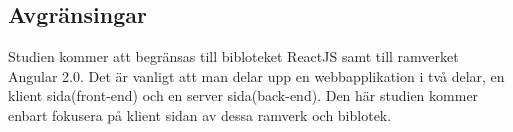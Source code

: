 \subsection{Avgränsingar}
\label{subsec:delimitations}
Studien kommer att begränsas till bibloteket ReactJS samt till ramverket Angular 2.0. Det är vanligt att man delar upp en webbapplikation i två delar, en klient sida(front-end) och en server sida(back-end). Den här studien kommer enbart fokusera på klient sidan av dessa ramverk och biblotek. 




